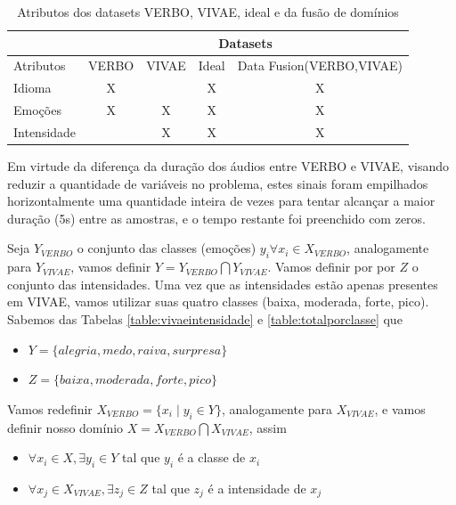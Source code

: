 \begin{table}[]
\centering
\caption{Atributos dos datasets VERBO, VIVAE, ideal e da fusão de domínios}
\begin{tabular}{l|cccc|}
\cline{2-5}
 & \multicolumn{4}{c|}{Datasets} \\ \hline
\multicolumn{1}{|l|}{Atributos} & \multicolumn{1}{c|}{VERBO} & \multicolumn{1}{c|}{VIVAE} & \multicolumn{1}{c|}{Ideal} & Data Fusion(VERBO,VIVAE) \\ \hline
\multicolumn{1}{|l|}{Idioma} & \multicolumn{1}{c|}{X} & \multicolumn{1}{c|}{} & \multicolumn{1}{c|}{X} & X \\ \hline
\multicolumn{1}{|l|}{Emoções} & \multicolumn{1}{c|}{X} & \multicolumn{1}{c|}{X} & \multicolumn{1}{c|}{X} & X \\ \hline
\multicolumn{1}{|l|}{Intensidade} & \multicolumn{1}{c|}{} & \multicolumn{1}{c|}{X} & \multicolumn{1}{c|}{X} & X \\ \hline
\end{tabular}\label{table:datasetideal}
\end{table}

Em virtude da diferença da duração dos áudios entre VERBO e VIVAE, visando reduzir a quantidade de variáveis no problema, estes sinais foram empilhados horizontalmente uma quantidade inteira de vezes para tentar alcançar a maior duração (5s) entre as amostras, e o tempo restante foi preenchido com zeros.

Seja $Y_{VERBO}$ o conjunto das classes (emoções) $y_i \forall x_i \in X_{VERBO}$, analogamente para $Y_{VIVAE}$, vamos definir $Y = Y_{VERBO} \bigcap Y_{VIVAE}$. Vamos definir por por $Z$ o conjunto das intensidades. Uma vez que as intensidades estão apenas presentes em \acrshort{VIVAE}, vamos utilizar suas quatro classes (baixa, moderada, forte, pico). Sabemos das Tabelas \ref{table:vivaeintensidade} e \ref{table:totalporclasse} que

\begin{itemize}
    \item $Y = \{alegria, medo, raiva, surpresa\}$
    \item $Z = \{baixa, moderada, forte, pico\}$
\end{itemize}

Vamos redefinir $X_{VERBO} = \{x_i \mid y_i \in Y\}$, analogamente para $X_{VIVAE}$, e vamos definir nosso domínio $X = X_{VERBO} \bigcap X_{VIVAE}$, assim

\begin{itemize}
    \item $\forall x_i \in X, \exists y_i \in Y$ tal que  $y_i$ é a classe de $x_i$
    \item $\forall x_j \in X_{VIVAE}, \exists z_j \in Z$ tal que  $z_j$ é a intensidade de $x_j$
\end{itemize}

